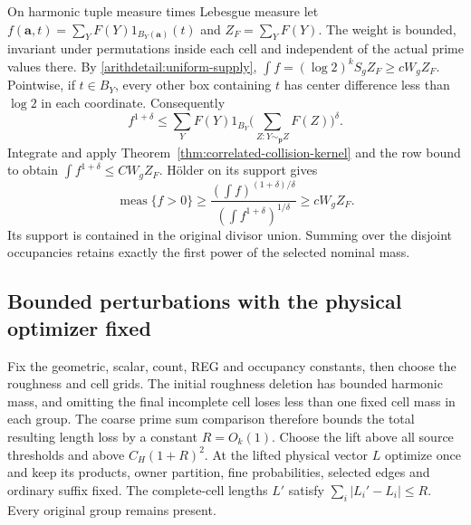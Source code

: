 On harmonic tuple measure times Lebesgue measure let
$f(\mathbf a,t)=\sum_YF(Y)1_{B_Y(\mathbf a)}(t)$ and
$Z_F=\sum_YF(Y)$. The weight is bounded, invariant under permutations
inside each cell and independent of the actual prime values there.
By \eqref{arithdetail:uniform-supply},
$\int f=(\log2)^kS_gZ_F\geq cW_gZ_F$.
Pointwise, if $t\in B_Y$, every other box containing $t$ has
center difference less than $\log2$ in each coordinate. Consequently
\[
 f^{1+\delta}
 \leq\sum_YF(Y)1_{B_Y}
       \Big(\sum_{Z:Y\sim_{\mathbf p}Z}F(Z)\Big)^\delta.
\]
Integrate and apply Theorem~\ref{thm:correlated-collision-kernel} and
the row bound to obtain $\int f^{1+\delta}\leq CW_gZ_F$.
H\"older on its support gives
\[
 \operatorname{meas}\{f>0\}
 \geq\frac{(\int f)^{(1+\delta)/\delta}}
             {(\int f^{1+\delta})^{1/\delta}}
 \geq cW_gZ_F.
\]
Its support is contained in the original divisor union. Summing over
the disjoint occupancies retains exactly the first power of the
selected nominal mass.

\subsection{Bounded perturbations with the physical optimizer fixed}
\label{arithdetail:frozen-grid}
Fix the geometric, scalar, count, REG and occupancy constants, then
choose the roughness and cell grids. The initial roughness deletion
has bounded harmonic mass, and omitting the final incomplete cell
loses less than one fixed cell mass in each group. The coarse prime
sum comparison  therefore bounds the total resulting
length loss by a constant $R=O_k(1)$. Choose the lift above all source thresholds and above
$C_H(1+R)^2$. At the lifted physical vector $L$ optimize once and keep
its products, owner partition, fine probabilities, selected edges and
ordinary suffix fixed. The complete-cell lengths $L'$ satisfy
$\sum_i|L_i'-L_i|\leq R$. Every original group remains present.

